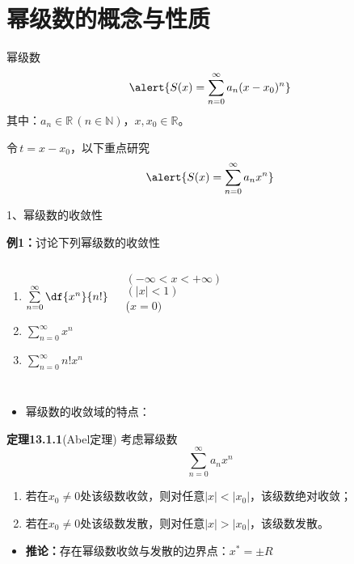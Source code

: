 \section{幂级数的概念与性质}

\begin{frame}{幂级数}
	\linespread{1.2}
	$$\alert{S(x)=\sum\limits_{n=0}^{\infty}a_n(x-x_0)^n}$$
	其中：$a_n\in\mathbb{R}\,(n\in\mathbb{N})$，$x,x_0\in\mathbb{R}$。
	
	\bigskip
	\pause \quad 令\,{$t=x-x_0$}，\pause 以下重点研究
	$$\alert{S(x)=\sum\limits_{n=0}^{\infty}a_nx^n}$$
\end{frame}

\begin{frame}{1、幂级数的收敛性}
	\linespread{1.8}
	\begin{exampleblock}{{\bf 例1：}讨论下列幂级数的收敛性\hfill}
		\begin{columns}\pause 
				\begin{enumerate}
				  \item $\sum\limits_{n=0}^{\infty}\df{x^n}{n!}$\pause 
				  \item $\sum\limits_{n=0}^{\infty}x^n$\pause 
				  \item $\sum\limits_{n=0}^{\infty}n!x^n$\pause 
				\end{enumerate}
				\alert{$(-\infty<x<+\infty)$}\pause \\[4pt]
				\alert{$(|x|<1)$}\pause \\[4pt]
				\alert{($x=0)$}\pause 
		\end{columns}
	\end{exampleblock}
	\vspace{-1em}
	\begin{itemize}
	  \item \alert{幂级数的收敛域的特点：}
	\end{itemize}
\end{frame}

\begin{frame}
	\linespread{1.2}\pause 
	\begin{block}{{\bf 定理13.1.1}(Abel定理)\hfill}
		考虑幂级数
		$$\sum\limits_{n=0}^{\infty}a_nx^n$$
		\pause
		\begin{enumerate}
		  \item 若在$x_0\ne 0$处该级数收敛，则对任意$|x|<|x_0|$，该级数绝对收敛；\pause 
		  \item 若在$x_0\ne 0$处该级数发散，则对任意$|x|>|x_0|$，该级数发散。\pause 
		\end{enumerate}
	\end{block}
	\begin{itemize}
	  \item \alert{{\bf 推论：}存在幂级数收敛与发散的边界点：$x^*=\pm R$}
	\end{itemize}
\end{frame}

